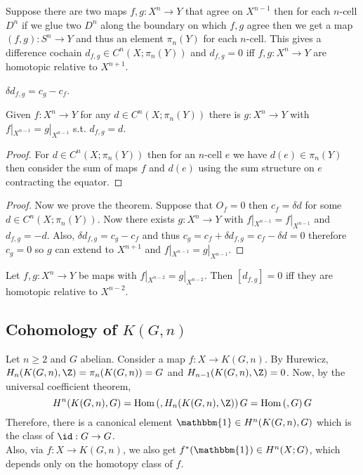\documentclass[12pt]{extarticle}
\begin{document}
\begin{definition}
Suppose there are two maps $f, g : X^n \to Y$ that agree on $X^{n-1}$ then for each $n$-cell $D^n$ if we glue two $D^n$ along the boundary on which $f,g$ agree then we get a map $(f, g) : S^n \to Y$ and thus an element $\pi_n(Y)$ for each $n$-cell. This gives a difference cochain $d_{f,g} \in C^n(X ; \pi_n(Y))$ and $d_{f,g} = 0$ iff $f,g : X^n \to Y$ are homotopic relative to $X^{n+1}$.  
\end{definition}

\begin{lemma}
$\delta d_{f,g} = c_g - c_f$.
\end{lemma}

\begin{lemma}
Given $f : X^n \to Y$ for any $d \in C^n(X; \pi_n(Y))$ there is $g : X^n \to Y$ with $f|_{X^{n-1}} = g|_{X^{n-1}}$ s.t. $d_{f,g} = d$. 
\end{lemma}

\begin{proof}
For $d \in C^n(X; \pi_n(Y))$ then for an $n$-cell $e$ we have $d(e) \in \pi_n(Y)$ then consider the sum of maps $f$ and $d(e)$ using the sum structure on $e$ contracting the equator. 
\end{proof}

\begin{proof}
Now we prove the theorem. Suppose that $O_f = 0$ then $c_f = \delta d$ for some $d \in C^n(X ; \pi_n(Y))$. Now there exists $g : X^n \to Y$ with $f|_{X^{n-1}} = f|_{X^{n-1}}$ and $d_{f,g} = -d$. Also, $\delta d_{f,g} = c_g - c_f$ and thus $c_g = c_f + \delta d_{f,g} = c_f - \delta d = 0$ therefore $c_g = 0$ so $g$ can extend to $X^{n+1}$ and $f|_{X^{n-1}} = g|_{X^{n-1}}$. 
\end{proof}

\begin{theorem}
Let $f,g : X^n \to Y$ be maps with $f|_{X^{n-2}} = g|_{X^{n-2}}$. Then $[d_{f,g}] = 0$ iff they are homotopic relative to $X^{n-2}$. 
\end{theorem}

\subsection{Cohomology of $K(G, n)$}

Let $n \ge 2$ and $G$ abelian. Consider a map $f : X \to K(G, n)$. By Hurewicz, $H_n(K(G, n), \Z) = \pi_n(K(G, n)) = G$ and $H_{n-1}(K(G, n), \Z) = 0$. Now, by the universal coefficient theorem,
\[ H^n(K(G, n), G) = \Hom{}{H_n(K(G, n), \Z)}{G} = \Hom{}{G}{G} \]
Therefore, there is a canonical element $\mathbbm{1} \in H^n(K(G, n), G)$ which is the class of $\id : G \to G$. 
\bigskip\\
Also, via $f : X \to K(G, n)$, we also get $f^*(\mathbbm{1}) \in H^n(X ; G)$, which depends only on the homotopy class of $f$. 
\end{document}
